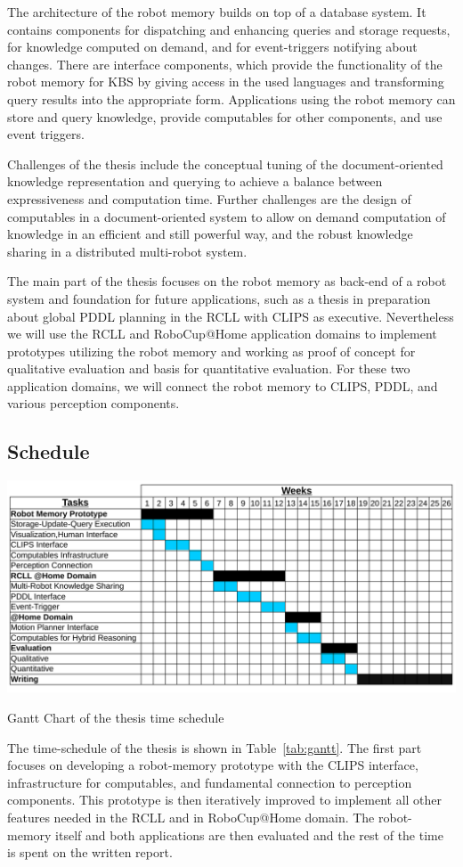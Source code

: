 \documentclass[a4paper,11pt]{article}
\newcommand{\reftab}[1]{Table~\ref{#1}}
\begin{document}
The architecture of the robot memory builds on top of a database
system. It contains components for dispatching and enhancing queries
and storage requests, for knowledge computed on demand, and for
event-triggers notifying about changes. There are interface
components, which provide the functionality of the robot memory for
KBS by giving access in the used languages and transforming query
results into the appropriate form. Applications using the robot memory
can store and query knowledge, provide computables for other
components, and use event triggers.

Challenges of the thesis include the conceptual tuning of the
document-oriented knowledge representation and querying to achieve a
balance between expressiveness and computation time. Further
challenges are the design of computables in a document-oriented system
to allow on demand computation of knowledge in an efficient and still
powerful way, and the robust knowledge sharing in a distributed
multi-robot system.

The main part of the thesis focuses on the robot memory as back-end of
a robot system and foundation for future applications, such as a
thesis in preparation about global PDDL planning in the RCLL with
CLIPS as executive. Nevertheless we will use the RCLL and RoboCup@Home
application domains to implement prototypes utilizing the robot memory
and working as proof of concept for qualitative evaluation and basis
for quantitative evaluation. For these two application domains, we
will connect the robot memory to CLIPS, PDDL, and various perception
components.

\subsection{Schedule}
\begin{table}
  \centering
  \includegraphics[width=\textwidth]{gantt-chart}%
  \vspace{-5mm}
  \caption{Gantt Chart of the thesis time schedule}
  \label{tab:gantt}
\end{table}
The time-schedule of the thesis is shown in \reftab{tab:gantt}. The
first part focuses on developing a robot-memory prototype with the
CLIPS interface, infrastructure for computables, and fundamental
connection to perception components. This prototype is then
iteratively improved to implement all other features needed in the
RCLL and in RoboCup@Home domain. The robot-memory itself and both
applications are then evaluated and the rest of the time is spent on
the written report.




\end{document}
